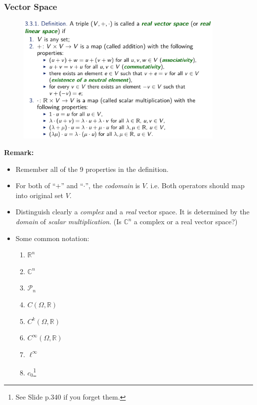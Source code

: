 \documentclass[10pt, t]{beamer}
\renewcommand{\emph}[1]{{\color{themecolor}\textsl{#1}}}
\newcommand{\R}{\mathbb{R}}
\begin{document}
\begin{frame}[allowframebreaks]
    \frametitle{Vector Space}
    \begin{figure}[H]
        \centering
        \includegraphics[width=0.9\textwidth]{2020-11-17-19-48-09.png}
    \end{figure}
    \textbf{Remark:}
    \begin{itemize}
        \item 
        Remember all of the 9 properties in the definition.
        \item For both of ``$+$'' and ``$\cdot$'', the \emph{codomain} is $V$. i.e. Both operators should map into original set $V$.
        \item Distinguish clearly a \emph{complex} and a \emph{real} vector space. It is determined by the \emph{domain} of \emph{scalar multiplication}. (Is $\mathbb{C}^n$ a complex or a real vector space?) 
        \item Some common notation:\begin{enumerate}
            \item $\R^n$
            \item $\mathbb{C}^n$
            \item $\mathcal{P}_n$
            \item $C(\Omega , \R)$
            \item $C^k(\Omega , \R)$
            \item $C^\infty(\Omega , \R)$
            \item $\ell^\infty$
            \item $c_0$\footnote[frame]{See Slide p.340 if you forget them.}
        \end{enumerate}
    \end{itemize}
\end{frame}
\end{document}
